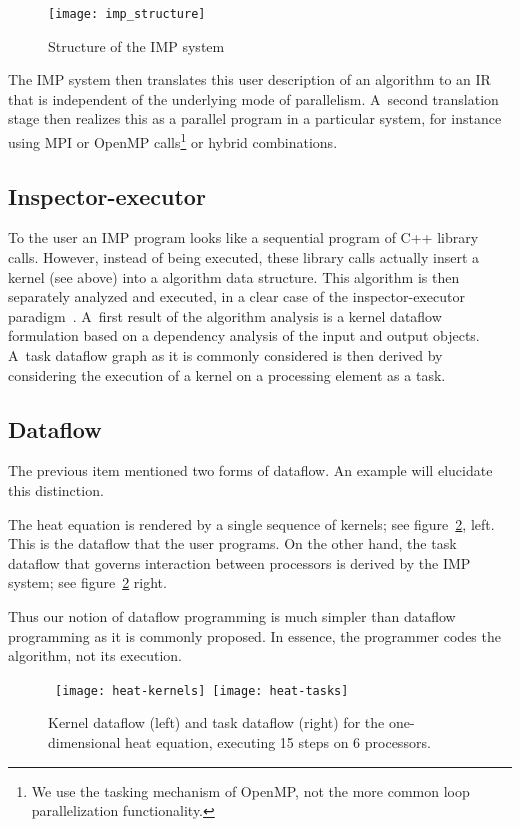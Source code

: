 \documentclass[11pt,fleqn,preprint]{impreport}
\begin{document}
\begin{figure}[ht]
  \texttt{[image: imp\_structure]}
  \caption{Structure of the IMP system}
  \label{fig:structure}
\end{figure}

The IMP system then translates this user description of an algorithm to an
\ac{IR} that is independent of the underlying mode of parallelism.
A~second translation stage then realizes this as a parallel program
in a particular system, for instance using
MPI or OpenMP calls\footnote {We use the tasking mechanism
  of OpenMP, not the more common loop parallelization functionality.}
or hybrid combinations.

\subsection{Inspector-executor} To the user an IMP program looks like
a sequential program of C++ library calls. However, instead of being executed,
these library calls actually insert a kernel (see above)
into a algorithm data structure. This algorithm
is then separately analyzed and executed, in a clear case of the inspector-executor
paradigm~\cite{Sussman92partiprimitives}. A~first result of the algorithm
analysis is a kernel dataflow formulation
based on a dependency analysis of the input and output objects.
A~task dataflow graph as it is commonly considered is then derived
by considering the execution of a kernel on a processing element as a task.

\subsection{Dataflow}
\label{sec:dataflow}

The previous item mentioned two forms of dataflow.
An example will elucidate this distinction.

The heat equation
is rendered by a single sequence of kernels; see figure~\ref{fig:heat-flow}, left.
This is the dataflow that the user programs.
%
On the other hand, the task dataflow that governs interaction between
processors is derived by the IMP system; see figure~\ref{fig:heat-flow} right.

Thus our notion of dataflow programming is much simpler
than dataflow programming as it is commonly proposed. In essence,
the programmer codes the algorithm, not its execution.

\begin{figure}[p]
\hbox\bgroup
  \texttt{[image: heat-kernels]}
  \texttt{[image: heat-tasks]}
  \egroup
  \caption{Kernel dataflow (left) and task dataflow (right) for the one-dimensional heat equation,
    executing 15 steps on 6 processors.}
  \label{fig:heat-flow}
\end{figure}
\end{document}
